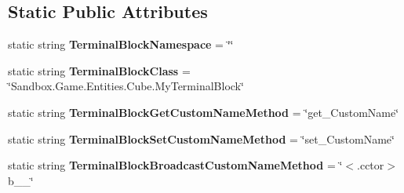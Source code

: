 \subsection*{Static Public Attributes}
\begin{DoxyCompactItemize}
\item 
\hypertarget{class_s_e_mod_a_p_i_internal_1_1_a_p_i_1_1_entity_1_1_sector_1_1_sector_object_1_1_cube_grid_1_120546f0333a2c3c0991eba1a19f6100c_a7de07d8685670903d1affc2c982acf26}{}static string {\bfseries Terminal\+Block\+Namespace} = \char`\"{}\char`\"{}\label{class_s_e_mod_a_p_i_internal_1_1_a_p_i_1_1_entity_1_1_sector_1_1_sector_object_1_1_cube_grid_1_120546f0333a2c3c0991eba1a19f6100c_a7de07d8685670903d1affc2c982acf26}

\item 
\hypertarget{class_s_e_mod_a_p_i_internal_1_1_a_p_i_1_1_entity_1_1_sector_1_1_sector_object_1_1_cube_grid_1_120546f0333a2c3c0991eba1a19f6100c_a9e1e73d44f15ed2d45156c5532c4f04d}{}static string {\bfseries Terminal\+Block\+Class} = \char`\"{}Sandbox.\+Game.\+Entities.\+Cube.\+My\+Terminal\+Block\char`\"{}\label{class_s_e_mod_a_p_i_internal_1_1_a_p_i_1_1_entity_1_1_sector_1_1_sector_object_1_1_cube_grid_1_120546f0333a2c3c0991eba1a19f6100c_a9e1e73d44f15ed2d45156c5532c4f04d}

\item 
\hypertarget{class_s_e_mod_a_p_i_internal_1_1_a_p_i_1_1_entity_1_1_sector_1_1_sector_object_1_1_cube_grid_1_120546f0333a2c3c0991eba1a19f6100c_a673a3ddaee2fcc66d58b3bbc890aaf29}{}static string {\bfseries Terminal\+Block\+Get\+Custom\+Name\+Method} = \char`\"{}get\+\_\+\+Custom\+Name\char`\"{}\label{class_s_e_mod_a_p_i_internal_1_1_a_p_i_1_1_entity_1_1_sector_1_1_sector_object_1_1_cube_grid_1_120546f0333a2c3c0991eba1a19f6100c_a673a3ddaee2fcc66d58b3bbc890aaf29}

\item 
\hypertarget{class_s_e_mod_a_p_i_internal_1_1_a_p_i_1_1_entity_1_1_sector_1_1_sector_object_1_1_cube_grid_1_120546f0333a2c3c0991eba1a19f6100c_a92c8e35a8722882b89fe80df4994eea4}{}static string {\bfseries Terminal\+Block\+Set\+Custom\+Name\+Method} = \char`\"{}set\+\_\+\+Custom\+Name\char`\"{}\label{class_s_e_mod_a_p_i_internal_1_1_a_p_i_1_1_entity_1_1_sector_1_1_sector_object_1_1_cube_grid_1_120546f0333a2c3c0991eba1a19f6100c_a92c8e35a8722882b89fe80df4994eea4}

\item 
\hypertarget{class_s_e_mod_a_p_i_internal_1_1_a_p_i_1_1_entity_1_1_sector_1_1_sector_object_1_1_cube_grid_1_120546f0333a2c3c0991eba1a19f6100c_a68a20b57f8772a88301b34baf26d93e7}{}static string {\bfseries Terminal\+Block\+Broadcast\+Custom\+Name\+Method} = \char`\"{}$<$.cctor$>$b\+\_\+\+\_\char`\"{}\label{class_s_e_mod_a_p_i_internal_1_1_a_p_i_1_1_entity_1_1_sector_1_1_sector_object_1_1_cube_grid_1_120546f0333a2c3c0991eba1a19f6100c_a68a20b57f8772a88301b34baf26d93e7}

\end{DoxyCompactItemize}
